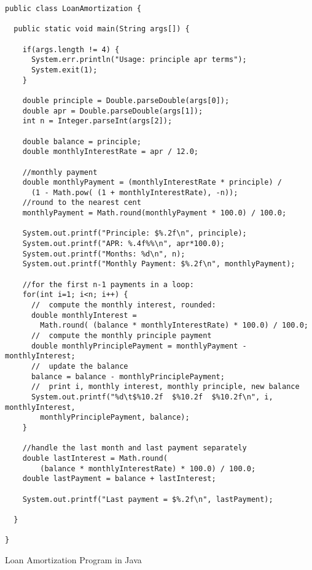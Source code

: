 \begin{listing}
\begin{verbatim}
public class LoanAmortization {

  public static void main(String args[]) {

    if(args.length != 4) {
      System.err.println("Usage: principle apr terms");
      System.exit(1);
    }

    double principle = Double.parseDouble(args[0]);
    double apr = Double.parseDouble(args[1]);
    int n = Integer.parseInt(args[2]);
    
    double balance = principle;
    double monthlyInterestRate = apr / 12.0;

    //monthly payment  
    double monthlyPayment = (monthlyInterestRate * principle) / 
      (1 - Math.pow( (1 + monthlyInterestRate), -n));
    //round to the nearest cent
    monthlyPayment = Math.round(monthlyPayment * 100.0) / 100.0;

    System.out.printf("Principle: $%.2f\n", principle);
    System.out.printf("APR: %.4f%%\n", apr*100.0);
    System.out.printf("Months: %d\n", n);
    System.out.printf("Monthly Payment: $%.2f\n", monthlyPayment);

    //for the first n-1 payments in a loop:
    for(int i=1; i<n; i++) {  
      //  compute the monthly interest, rounded:
      double monthlyInterest = 
        Math.round( (balance * monthlyInterestRate) * 100.0) / 100.0;
      //  compute the monthly principle payment
      double monthlyPrinciplePayment = monthlyPayment - monthlyInterest;
      //  update the balance
      balance = balance - monthlyPrinciplePayment;
      //  print i, monthly interest, monthly principle, new balance
      System.out.printf("%d\t$%10.2f  $%10.2f  $%10.2f\n", i, monthlyInterest, 
        monthlyPrinciplePayment, balance);
    }

    //handle the last month and last payment separately
    double lastInterest = Math.round( 
    	(balance * monthlyInterestRate) * 100.0) / 100.0;
    double lastPayment = balance + lastInterest;

    System.out.printf("Last payment = $%.2f\n", lastPayment);

  }

}
\end{verbatim}
\caption{Loan Amortization Program in Java}
\label{code:java:loanAmortization}
\end{listing}




